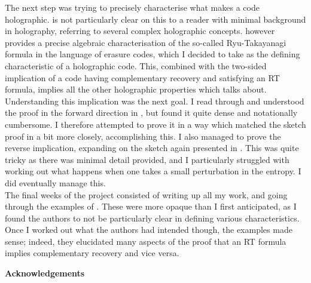 \documentclass[12pt,a4paper]{report}
\numberwithin{equation}{section}
\theoremstyle{definition}
\theoremstyle{theorem}
\theoremstyle{theorem}
\theoremstyle{example}
\theoremstyle{definition}
\begin{document}
The next step was trying to precisely characterise what makes a code holographic. \cite{Harlow} is not particularly clear on this to a reader with minimal background in holography, referring to several complex holographic concepts. \cite{Pollack} however provides a precise algebraic characterisation of the so-called Ryu-Takayanagi formula in the language of erasure codes, which I decided to take as the defining characteristic of a holographic code. This, combined with the two-sided implication of a code having complementary recovery and satisfying an RT formula, implies all the other holographic properties which \cite{Harlow} talks about. Understanding this implication was the next goal. I read through and understood the proof in the forward direction in \cite{Pollack}, but found it quite dense and notationally cumbersome. I therefore attempted to prove it in a way which matched the sketch proof in \cite{Harlow} a bit more closely, accomplishing this. I also managed to prove the reverse implication, expanding on the sketch again presented in \cite{Harlow}. This was quite tricky as there was minimal detail provided, and I particularly struggled with working out what happens when one takes a small perturbation in the entropy. I did eventually manage this.\\
The final weeks of the project consisted of writing up all my work, and going through the examples of \cite{Pollack}. These were more opaque than I first anticipated, as I found the authors to not be particularly clear in defining various characteristics. Once I worked out what the authors had intended though, the examples made sense; indeed, they elucidated many aspects of the proof that an RT formula implies complementary recovery and vice versa.



\newpage

\begin{center}
\textbf{Acknowledgements}
\end{center}
\end{document}
